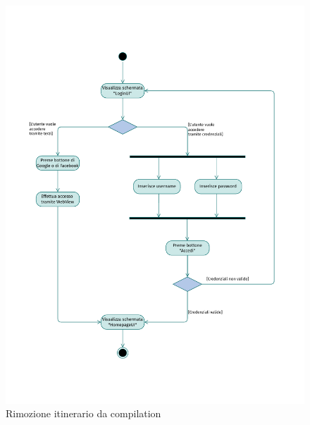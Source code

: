 \documentclass{natourDoc}
\begin{document}
	\newpage
	\begin{figure}[!htbp]
		\centering
		\includegraphics[width=\textwidth, page=9]{./diagrams/activity.pdf}
		\caption{Rimozione itinerario da compilation}
	\end{figure}
	\FloatBarrier

	\newpage
\end{document}
